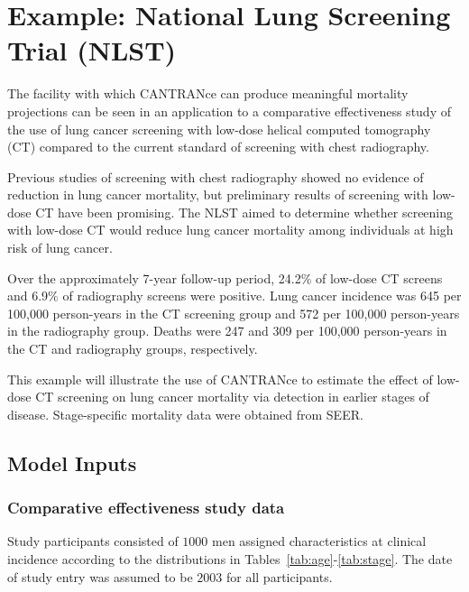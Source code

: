 \documentclass[11pt]{article}
\begin{document}
\section{Example: National Lung Screening Trial (NLST)}

The facility with which CANTRANce can produce meaningful mortality projections can be seen in an application to a comparative effectiveness study of the use of lung cancer screening with low-dose helical computed tomography (CT) compared to the current standard of screening with chest radiography\cite{nlst_reduced_2011}.

Previous studies of screening with chest radiography showed no evidence of reduction in lung cancer mortality, but preliminary results of screening with low-dose CT have been promising. 
The NLST aimed to determine whether screening with low-dose CT would reduce lung cancer mortality among individuals at high risk of lung cancer\cite{nlst_reduced_2011}.

Over the approximately 7-year follow-up period, 24.2\% of low-dose CT screens and 6.9\% of radiography screens were positive. 
Lung cancer incidence was 645 per 100,000 person-years in the CT screening group and 572 per 100,000 person-years in the radiography group. 
Deaths were 247 and 309 per 100,000 person-years in the CT and radiography groups, respectively\cite{nlst_reduced_2011}.

This example will illustrate the use of CANTRANce to estimate the effect of low-dose CT screening on lung cancer mortality via detection in earlier stages of disease. Stage-specific mortality data were obtained from SEER.


\subsection{Model Inputs}


\subsubsection{Comparative effectiveness study data}

Study participants consisted of $1000$ men assigned characteristics at clinical incidence according to the distributions in Tables~\ref{tab:age}-\ref{tab:stage}. 
The date of study entry was assumed to be $2003$ for all participants.
\end{document}
